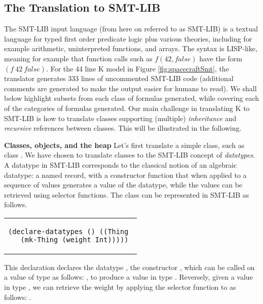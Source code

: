 \subsection{The Translation to SMT-LIB}

The SMT-LIB input language (from here on referred to as SMT-LIB) is a
textual language for typed first order predicate logic plus various
theories, including for example arithmetic, uninterpreted functions,
and arrays. The syntax is LISP-like, meaning for example that function
calls such as $f(42,false)$ have the form $(f\ 42\ false)$. For the 44
line K model in Figure \ref{fig:spacecraftSmt}, the translator
generates 333 lines of uncommented SMT-LIB code (additional comments
are generated to make the output easier for humans to read). We shall
below highlight subsets from each class of formulas generated, while
covering each of the categories of formulas generated. Our main challenge
in translating K to SMT-LIB is how to translate classes 
supporting (multiple) {\em inheritance} and {\em recursive} references
between classes. This will be illustrated in the following.

\textbf{Classes, objects, and the heap} Let's first translate a simple
class, such as class .  We have chosen to translate
classes to the SMT-LIB concept of {\em datatypes}. A datatype in
SMT-LIB corresponds to the classical notion of an algebraic datatype:
a named record, with a constructor function that when applied to a
sequence of values generates a value of the datatype, while the values
can be retrieved using selector functions.  The class 
can be represented in SMT-LIB as follows.

\lstset{language=SMT,numbers=none}

\begin{center}
\begin{tabular}{c}
\begin{lstlisting}
(declare-datatypes () ((Thing 
  (mk-Thing (weight Int)))))
\end{lstlisting}
\end{tabular}
\end{center}

\noindent This declaration declares the datatype , the
constructor , which can be called on a value 
of type  as follows: , to produce a
value in type . Reversely, given a value  in type
, we can retrieve the weight by applying the selector
function  to  as follows: .


